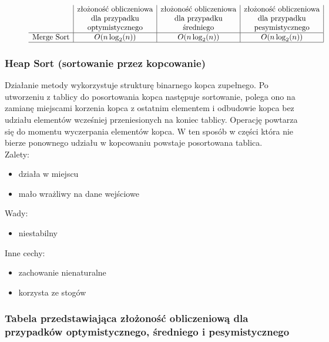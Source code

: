 \documentclass[polish,polish,a4paper]{article}
\begin{document}
\begin{spacing}{1.5}
\begin{figure}[H]
		\begin{equation*}
		\begin{array}{l|c|c|c|}

		&$złożoność obliczeniowa$&$złożoność obliczeniowa$&$złożoność obliczeniowa$\\
		&$dla przypadku$&$dla przypadku$&$dla przypadku$\\
		&$optymistycznego$&$średniego$&$pesymistycznego$\\
		\hline
		$Merge Sort$&O(n\log_{2}(n))&O(n\log_{2}(n))&O(n\log_{2}(n))\\
		\hline
		\end{array}
		\end{equation*}
	\end{figure}
	
			\subsubsection*{Heap Sort (sortowanie przez kopcowanie)}
			Działanie metody wykorzystuje strukturę binarnego kopca zupełnego. Po utworzeniu z tablicy do posortowania kopca następuje sortowanie, polega ono na zamianę miejscami korzenia kopca z ostatnim elementem i odbudowie kopca bez udziału elementów wcześniej przeniesionych na koniec tablicy. Operację powtarza się do momentu wyczerpania elementów kopca. W ten sposób w części która nie bierze ponownego udziału w kopcowaniu powstaje posortowana tablica.\\
						
Zalety:
\begin{itemize}
	\item działa w miejscu
	\item  mało wrażliwy na dane wejściowe
\end{itemize}
Wady:
\begin{itemize}
	\item niestabilny

\end{itemize}
Inne cechy:
\begin{itemize}
	\item zachowanie nienaturalne
	\item korzysta ze stogów
\end{itemize}

\subsubsection*{Tabela przedstawiająca złożoność obliczeniową dla przypadków optymistycznego, średniego i pesymistycznego} 
\begin{figure}[H]
	

\end{figure}
\end{spacing}
\end{document}
